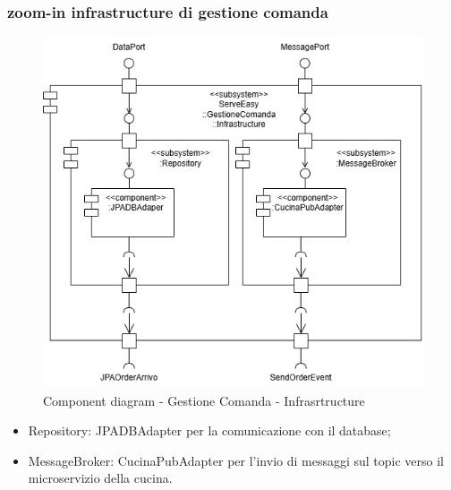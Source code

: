\subsubsection{zoom-in infrastructure di gestione comanda}
\begin{figure}[H]
	\centering
	\includegraphics[scale=0.5]{iterazione1/images/component_comanda_cucina-GestioneComanda__Infrastructure.jpg}
	\caption{Component diagram - Gestione Comanda - Infrasrtructure \label{fig:component_diagram_gestione_comanda_infrastracture}}
\end{figure}
\begin{itemize}
    \item Repository: JPADBAdapter per la comunicazione con il database;
    \item MessageBroker: CucinaPubAdapter per l'invio di messaggi sul topic verso il microservizio della cucina.
\end{itemize}

